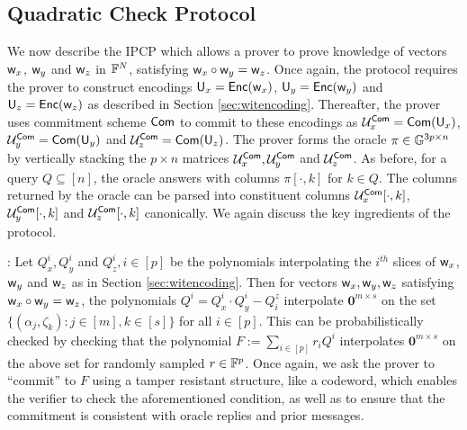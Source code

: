 \subsection{Quadratic Check Protocol}
We now describe the IPCP which allows a prover to prove knowledge of vectors
$\mathsf{w}_x$, $\mathsf{w}_y$ and $\mathsf{w}_z$ in $\mathbb{F}^N$, satisfying $\mathsf{w}_x\circ \mathsf{w}_y =
\mathsf{w}_z$. Once again, the protocol requires the prover to construct encodings
$\mathsf{U}_x=\mathsf{Enc}(\mathsf{w}_x)$, $\mathsf{U}_y=\mathsf{Enc}(\mathsf{w}_y)$ and $\mathsf{U}_z=\mathsf{Enc}(\mathsf{w}_z)$ as
described in Section \ref{sec:witencoding}. Thereafter, the prover uses
commitment scheme $\mathsf{Com}$ to commit to these encodings as $\mathcal{U}^{\mathsf{Com}}_x =
\mathsf{Com}(\mathsf{U}_x)$, $\mathcal{U}^{\mathsf{Com}}_y = \mathsf{Com}(\mathsf{U}_y)$ and $\mathcal{U}^{\mathsf{Com}}_z = \mathsf{Com}(\mathsf{U}_z)$. 
The prover forms the oracle $\pi\in \mathbb{G}^{3p\times n}$ by vertically stacking the
$p\times n$ matrices $\mathcal{U}^{\mathsf{Com}}_x,\mathcal{U}^{\mathsf{Com}}_y$ and $\mathcal{U}^{\mathsf{Com}}_z$. As before,
for a query $Q\subseteq [n]$, the oracle answers with columns $\pi[\cdot,k]$ for
$k\in Q$. The columns returned by the oracle can be parsed into constituent columns 
$\mathcal{U}^{\mathsf{Com}}_x[\cdot,k]$, $\mathcal{U}^{\mathsf{Com}}_y[\cdot,k]$ and $\mathcal{U}^{\mathsf{Com}}_z[\cdot,k]$
canonically. We again discuss the key ingredients of the protocol.\smallskip

: Let $Q^i_x,Q^i_y$ and $Q^i_z, i\in [p]$ be the
polynomials interpolating the $i^{th}$ slices of $\mathsf{w}_x$, $\mathsf{w}_y$ and $\mathsf{w}_z$
 as in Section \ref{sec:witencoding}. Then for vectors $\mathsf{w}_x,\mathsf{w}_y,\mathsf{w}_z$ satisfying
$\mathsf{w}_x\circ \mathsf{w}_y=\mathsf{w}_z$, the polynomials $Q^i=Q^i_x\cdot Q^i_y - Q^z_i$ interpolate
$\bm{0}^{m\times s}$ on the set $\{(\alpha_j,\zeta_k):j\in [m],k\in [s]\}$ for all $i\in [p]$. This can be probabilistically
checked by checking that the polynomial $F := \sum_{i\in [p]}r_iQ^i$ interpolates
$\bm{0}^{m\times s}$ on the above set for randomly sampled $r\in \mathbb{F}^p$. Once again, we
ask the prover to ``commit'' to $F$ using a tamper resistant structure, like a codeword,
which enables the verifier to check the aforementioned condition, as well as to
ensure that the commitment is consistent with oracle replies and prior
messages.\smallskip

